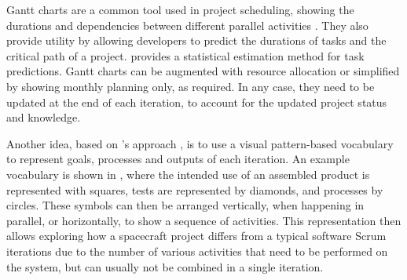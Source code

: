 \documentclass[a4paper,nobib,justified,final]{tufte-book}
\begin{document}
Gantt charts are a common tool used in project scheduling, showing the durations and dependencies between different parallel activities \autocite{honore-livermoreIntegratingAgileSystems2022}. They also provide utility by allowing developers to predict the durations of tasks and the critical path of a project. \citeauthor{douglassAgileSystemsEngineering2015} \autocite[62]{douglassAgileSystemsEngineering2015} provides a statistical estimation method for task predictions. Gantt charts can be augmented with resource allocation or simplified by showing monthly planning only, as required. In any case, they need to be updated at the end of each iteration, to account for the updated project status and knowledge.


Another idea, based on \citeauthor{ruedePatternLanguageComplexmode2023}'s approach \autocite{ruedePatternLanguageComplexmode2023}, is to use a visual pattern-based vocabulary to represent goals, processes and outputs of each iteration.
An example vocabulary is shown in , where the intended use of an assembled product is represented with squares, tests are represented by diamonds, and processes by circles.
These symbols can then be arranged vertically, when happening in parallel, or horizontally, to show a sequence of activities. This representation then allows exploring how a spacecraft project differs from a typical software Scrum iterations due to the number of various activities that need to be performed on the system, but can usually not be combined in a single iteration.
\end{document}
